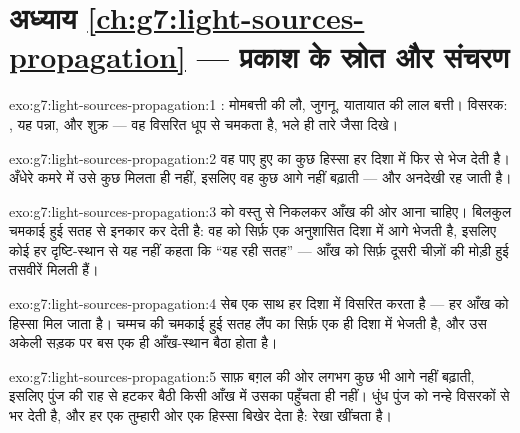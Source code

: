 \section*{अध्याय \ref{ch:g7:light-sources-propagation} --- प्रकाश के स्रोत और संचरण}

\begin{solution}{exo:g7:light-sources-propagation:1}
: मोमबत्ती की लौ, जुगनू, यातायात की लाल बत्ती। विसरक:
, यह पन्ना, और शुक्र --- वह  विसरित धूप से चमकता है, भले ही
तारे जैसा दिखे।
\end{solution}

\begin{solution}{exo:g7:light-sources-propagation:2}
वह पाए हुए  का कुछ हिस्सा हर दिशा में फिर से भेज देती है। अँधेरे
कमरे में उसे कुछ मिलता ही नहीं, इसलिए वह कुछ आगे नहीं बढ़ाती --- और
अनदेखी रह जाती है।
\end{solution}

\begin{solution}{exo:g7:light-sources-propagation:3}
 को वस्तु से निकलकर आँख की ओर आना चाहिए। बिलकुल चमकाई हुई सतह
\emph{} से इनकार कर देती है: वह  को सिर्फ़ एक अनुशासित दिशा
में आगे भेजती है, इसलिए कोई  हर दृष्टि-स्थान से यह नहीं कहता कि
``यह रही सतह'' --- आँख को सिर्फ़ दूसरी चीज़ों की मोड़ी हुई तसवीरें
मिलती हैं।
\end{solution}

\begin{solution}{exo:g7:light-sources-propagation:4}
सेब एक साथ हर दिशा में विसरित करता है --- हर आँख को हिस्सा मिल जाता
है। चम्मच की चमकाई हुई सतह लैंप का  सिर्फ़ एक ही दिशा में भेजती
है, और उस अकेली सड़क पर बस एक ही आँख-स्थान बैठा होता है।
\end{solution}

\begin{solution}{exo:g7:light-sources-propagation:5}
साफ़  बग़ल की ओर लगभग कुछ भी आगे नहीं बढ़ाती, इसलिए पुंज की राह से
हटकर बैठी किसी आँख में उसका  पहुँचता ही नहीं। धुंध पुंज को नन्हे
विसरकों से भर देती है, और हर एक तुम्हारी ओर एक हिस्सा बिखेर देता है:
रेखा  खींचता है।
\end{solution}

